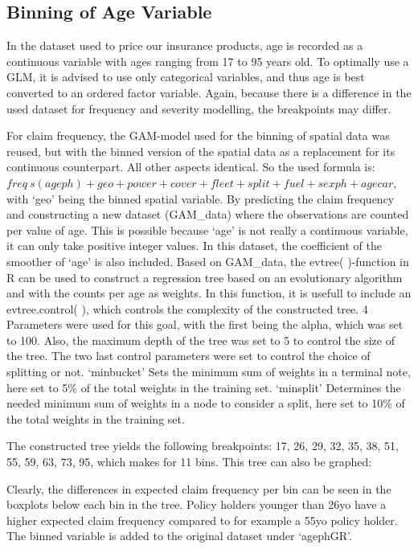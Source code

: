 \documentclass[
  12pt,
]{article}
\begin{document}
\hypertarget{binning-of-age-variable}{%
\subsection{Binning of Age Variable}\label{binning-of-age-variable}}

In the dataset used to price our insurance products, age is recorded as
a continuous variable with ages ranging from 17 to 95 years old. To
optimally use a GLM, it is advised to use only categorical variables,
and thus age is best converted to an ordered factor variable. Again,
because there is a difference in the used dataset for frequency and
severity modelling, the breakpoints may differ.

For claim frequency, the GAM-model used for the binning of spatial data
was reused, but with the binned version of the spatial data as a
replacement for its continuous counterpart. All other aspects identical.
So the used formula is:
\(freq ~ s(ageph) + geo + power + cover + fleet + split + fuel + sexph + agecar\),
with `geo' being the binned spatial variable. By predicting the claim
frequency and constructing a new dataset (GAM\_data) where the
observations are counted per value of age. This is possible because
`age' is not really a continuous variable, it can only take positive
integer values. In this dataset, the coefficient of the smoother of
`age' is also included. Based on GAM\_data, the evtree( )-function in R
can be used to construct a regression tree based on an evolutionary
algorithm and with the counts per age as weights. In this function, it
is usefull to include an evtree.control( ), which controls the
complexity of the constructed tree. 4 Parameters were used for this
goal, with the first being the alpha, which was set to 100. Also, the
maximum depth of the tree was set to 5 to control the size of the tree.
The two last control parameters were set to control the choice of
splitting or not. `minbucket' Sets the minimum sum of weights in a
terminal note, here set to 5\% of the total weights in the training set.
`minsplit' Determines the needed minimum sum of weights in a node to
consider a split, here set to 10\% of the total weights in the training
set.

The constructed tree yields the following breakpoints: 17, 26, 29, 32,
35, 38, 51, 55, 59, 63, 73, 95, which makes for 11 bins. This tree can
also be graphed:

Clearly, the differences in expected claim frequency per bin can be seen
in the boxplots below each bin in the tree. Policy holders younger than
26yo have a higher expected claim frequency compared to for example a
55yo policy holder. The binned variable is added to the original dataset
under `agephGR'.
\end{document}
